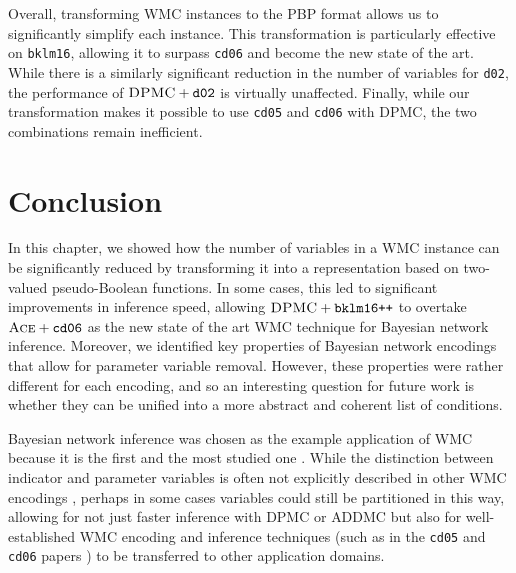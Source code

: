 Overall, transforming WMC instances to the PBP format allows us to significantly
simplify each instance. This transformation is particularly effective on
\texttt{bklm16}, allowing it to surpass \texttt{cd06} and become the new state
of the art. While there is a similarly significant reduction in the number of
variables for \texttt{d02}, the performance of $\textsc{DPMC}+\texttt{d02}$ is
virtually unaffected. Finally, while our transformation makes it possible to use
\texttt{cd05} and \texttt{cd06} with \textsc{DPMC}, the two combinations remain
inefficient.

\section{Conclusion}


In this chapter, we showed how the number of variables in a WMC instance can be
significantly reduced by transforming it into a representation based on
two-valued pseudo-Boolean functions. In some cases, this led to significant
improvements in inference speed, allowing $\textsc{DPMC} + \texttt{bklm16++}$ to
overtake $\textsc{Ace}+\texttt{cd06}$ as the new state of the art WMC technique
for Bayesian network inference. Moreover, we identified key properties of
Bayesian network encodings that allow for parameter variable removal. However,
these properties were rather different for each encoding, and so an interesting
question for future work is whether they can be unified into a more abstract and
coherent list of conditions.

Bayesian network inference was chosen as the example application of WMC because
it is the first and the most studied one
\citep{DBLP:conf/ecai/BartKLM16,DBLP:conf/ijcai/ChaviraD05,DBLP:conf/sat/ChaviraD06,DBLP:conf/kr/Darwiche02,DBLP:conf/aaai/SangBK05}.
While the distinction between indicator and parameter variables is often not
explicitly described in other WMC encodings
\citep{DBLP:journals/tplp/FierensBRSGTJR15,DBLP:journals/pacmpl/HoltzenBM20,DBLP:conf/icml/XuZFLB18},
perhaps in some cases variables could still be partitioned in this way, allowing
for not just faster inference with \textsc{DPMC} or \textsc{ADDMC} but also for
well-established WMC encoding and inference techniques (such as in the
\texttt{cd05} and \texttt{cd06} papers
\citep{DBLP:conf/ijcai/ChaviraD05,DBLP:conf/sat/ChaviraD06}) to be transferred to
other application domains.
